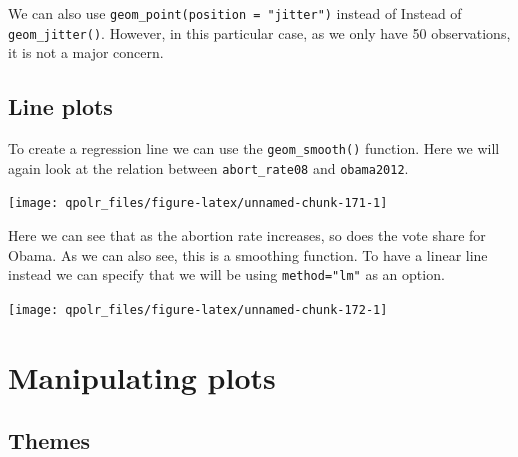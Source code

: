 \documentclass[12pt,oneside]{reedthesis}
\theoremstyle{definition}
\theoremstyle{definition}
\theoremstyle{definition}
\theoremstyle{remark}
\begin{document}
  We can also use \texttt{geom\_point(position\ =\ "jitter")} instead of
  Instead of \texttt{geom\_jitter()}. However, in this particular case, as
  we only have 50 observations, it is not a major concern.
  
  \subsection{Line plots}\label{line-plots}
  
  To create a regression line we can use the \texttt{geom\_smooth()}
  function. Here we will again look at the relation between
  \texttt{abort\_rate08} and \texttt{obama2012}.
  \begin{Shaded}
  \begin{Highlighting}[]
  \NormalTok{(}\OperatorTok{+}
  \StringTok{  }\NormalTok{()}
  \end{Highlighting}
  \end{Shaded}
  \begin{center}\texttt{[image: qpolr\_files/figure-latex/unnamed-chunk-171-1]} \end{center}
  
  Here we can see that as the abortion rate increases, so does the vote
  share for Obama. As we can also see, this is a smoothing function. To
  have a linear line instead we can specify that we will be using
  \texttt{method="lm"} as an option.
  \begin{Shaded}
  \begin{Highlighting}[]
  \NormalTok{(}\OperatorTok{+}
  \StringTok{  }\NormalTok{(}\NormalTok{)}
  \end{Highlighting}
  \end{Shaded}
  \begin{center}\texttt{[image: qpolr\_files/figure-latex/unnamed-chunk-172-1]} \end{center}
  
  \section{Manipulating plots}\label{manipulating-plots}
  
  \subsection{Themes}\label{themes}
  
\end{document}
